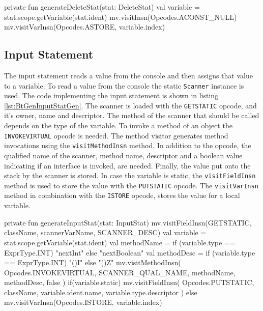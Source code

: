 \begin{KotlinCode}[float,numbers=none,caption=Implementation of the \texttt{generateDeleteStat} method of the \texttt{StatGenerator}., label=lst:BtGenDeleteStatGen]
private fun generateDeleteStat(stat: DeleteStat) {
    val variable = stat.scope.getVariable(stat.ident)
    mv.visitInsn(Opcodes.ACONST_NULL)
    mv.visitVarInsn(Opcodes.ASTORE, variable.index)
}
\end{KotlinCode}

\subsection{Input Statement}

The input statement reads a value from the console and then assigns that value to a variable. To read a value from the console the static \verb|Scanner| instance is used. The code implementing the input statement is shown in listing \ref{lst:BtGenInputStatGen}. The scanner is loaded with the \verb|GETSTATIC| opcode, and it's owner, name and descriptor. The method of the scanner that should be called depends on the type of the variable. To invoke a method of an object the \verb|INVOKEVIRTUAL| opcode is needed. The method visitor generates method invocations using the \verb|visitMethodInsn| method. In addition to the opcode, the qualified name of the scanner, method name, descriptor and a boolean value indicating if an interface is invoked, are needed. Finally, the value put onto the stack by the scanner is stored. In case the variable is static, the \verb|visitFieldInsn| method is used to store the value with the \verb|PUTSTATIC| opcode. The \verb|visitVarInsn| method in combination with the \verb|ISTORE| opcode, stores the value for a local variable. 


\begin{KotlinCode}[float,numbers=none,caption=Implementation of the \texttt{generateInputStat} method of the \texttt{StatGenerator}., label=lst:BtGenInputStatGen]
private fun generateInputStat(stat: InputStat) {
    mv.visitFieldInsn(GETSTATIC, className, scannerVarName, SCANNER_DESC)
    val variable = stat.scope.getVariable(stat.ident)
    val methodName = if (variable.type == ExprType.INT) "nextInt" else "nextBoolean"
    val methodDesc = if (variable.type == ExprType.INT) "()I" else "()Z"
    mv.visitMethodInsn(
        Opcodes.INVOKEVIRTUAL,
        SCANNER_QUAL_NAME,
        methodName,
        methodDesc,
        false
    )
    if(variable.static) {
        mv.visitFieldInsn(
            Opcodes.PUTSTATIC,
            className,
            variable.ident.name,
            variable.type.descriptor
        )
    } else {
        mv.visitVarInsn(Opcodes.ISTORE, variable.index)
    }
}
\end{KotlinCode}

